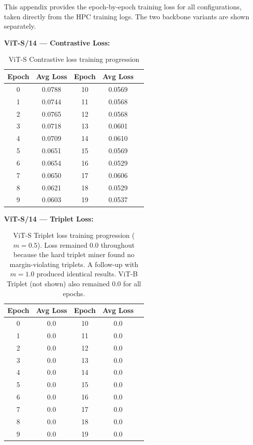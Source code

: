 \documentclass[
    english,
]{VUMIFPSbakalaurinis}
\begin{document}
\printbibliography[heading=bibintoc]


This appendix provides the epoch-by-epoch training loss for all configurations, taken directly from the HPC training logs. The two backbone variants are shown separately.

\textbf{ViT-S/14 — Contrastive Loss:}
\begin{table}[H]
\centering
\small
\begin{tabular}{ccccc}
\toprule
\textbf{Epoch} & \textbf{Avg Loss} & \textbf{Epoch} & \textbf{Avg Loss} \\
\midrule
0 & 0.0788 & 10 & 0.0569 \\
1 & 0.0744 & 11 & 0.0568 \\
2 & 0.0765 & 12 & 0.0568 \\
3 & 0.0718 & 13 & 0.0601 \\
4 & 0.0709 & 14 & 0.0610 \\
5 & 0.0651 & 15 & 0.0569 \\
6 & 0.0654 & 16 & 0.0529 \\
7 & 0.0650 & 17 & 0.0606 \\
8 & 0.0621 & 18 & 0.0529 \\
9 & 0.0603 & 19 & 0.0537 \\
\bottomrule
\end{tabular}
\caption{ViT-S Contrastive loss training progression}
\end{table}

\textbf{ViT-S/14 — Triplet Loss:}
\begin{table}[H]
\centering
\small
\begin{tabular}{ccccc}
\toprule
\textbf{Epoch} & \textbf{Avg Loss} & \textbf{Epoch} & \textbf{Avg Loss} \\
\midrule
0 & 0.0 & 10 & 0.0 \\
1 & 0.0 & 11 & 0.0 \\
2 & 0.0 & 12 & 0.0 \\
3 & 0.0 & 13 & 0.0 \\
4 & 0.0 & 14 & 0.0 \\
5 & 0.0 & 15 & 0.0 \\
6 & 0.0 & 16 & 0.0 \\
7 & 0.0 & 17 & 0.0 \\
8 & 0.0 & 18 & 0.0 \\
9 & 0.0 & 19 & 0.0 \\
\bottomrule
\end{tabular}
\caption{ViT-S Triplet loss training progression ($m = 0.5$). Loss remained 0.0 throughout because the hard triplet miner found no margin-violating triplets. A follow-up with $m = 1.0$ produced identical results. ViT-B Triplet (not shown) also remained 0.0 for all epochs.}
\end{table}
\end{document}
